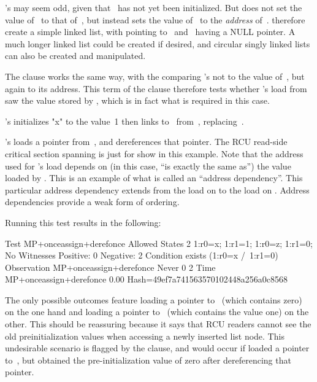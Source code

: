 \begin{fcvref}
's  may seem odd, given that ~has not yet
been initialized.
But  does not set the value of~ to that of~, but instead
sets the value of~ to the \emph{address} of~.
 therefore create a simple linked list, with 
pointing to~ and~ having a NULL pointer.
A much longer linked list could be created if desired, and circular singly
linked lists can also be created and manipulated.

The  clause works the same way, with the  comparing
's  not to the value of~, but again to its address.
This term of the  clause therefore tests whether
's load from~ saw the value stored by ,
which is in fact what is required in this case.

's  initializes "x" to the value~1 then 
links to~ from~, replacing~.

's  loads a pointer from~, and 
dereferences that pointer.
The RCU read-side critical section spanning 
is just for show in this example.
Note that the address used for 's load depends on
(in this case, ``is exactly the same as'') the value loaded by .
This is an example of what is called an ``address dependency''.
This particular address dependency extends from the load on  to the
load on .
Address dependencies provide a weak form of ordering.
\end{fcvref}

Running this test results in the following:

\begin{VerbatimN}[commandchars=\%\@\$]
	Test MP+onceassign+derefonce Allowed
	States 2
	1:r0=x; 1:r1=1;
	1:r0=z; 1:r1=0;
	No
	Witnesses
	Positive: 0 Negative: 2
	Condition exists (1:r0=x /\ 1:r1=0)
	Observation MP+onceassign+derefonce Never 0 2
	Time MP+onceassign+derefonce 0.00
	Hash=49ef7a741563570102448a256a0c8568
\end{VerbatimN}

The only possible outcomes feature  loading a pointer to~
(which contains zero) on the one hand and  loading a pointer to~
(which contains the value one) on the other.
This should be reassuring because it says that RCU readers cannot see the
old preinitialization values when accessing a newly inserted list node.
This undesirable scenario is flagged by the  clause, and
would occur if  loaded a pointer to~, but obtained
the pre-initialization value of zero after dereferencing that pointer.


